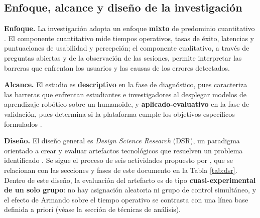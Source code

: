 \documentclass[stu,12pt,floatsintext]{apa7}
\begin{document}
\subsection{Enfoque, alcance y diseño de la investigación}

\textbf{Enfoque.} La investigación adopta un enfoque \textbf{mixto} de predominio cuantitativo \parencite{hernandezsampieri2014}. El componente cuantitativo mide tiempos operativos, tasas de éxito, latencias y puntuaciones de usabilidad y percepción; el componente cualitativo, a través de preguntas abiertas y de la observación de las sesiones, permite interpretar las barreras que enfrentan los usuarios y las causas de los errores detectados.

\textbf{Alcance.} El estudio es \textbf{descriptivo} en la fase de diagnóstico, pues caracteriza las barreras que enfrentan estudiantes e investigadores al desplegar modelos de aprendizaje robótico sobre un humanoide, y \textbf{aplicado-evaluativo} en la fase de validación, pues determina si la plataforma cumple los objetivos específicos formulados \parencite{hernandezsampieri2014}.

\textbf{Diseño.} El diseño general es \textit{Design Science Research} (DSR), un paradigma orientado a crear y evaluar artefactos tecnológicos que resuelven un problema identificado \parencite{hevner2004design}. Se sigue el proceso de seis actividades propuesto por \textcite{peffers2007dsrm}, que se relacionan con las secciones y fases de este documento en la Tabla \ref{tab:dsr}. Dentro de este diseño, la evaluación del artefacto es de tipo \textbf{cuasi-experimental de un solo grupo}: no hay asignación aleatoria ni grupo de control simultáneo, y el efecto de Armando sobre el tiempo operativo se contrasta con una línea base definida a priori (véase la sección de técnicas de análisis).
\end{document}
